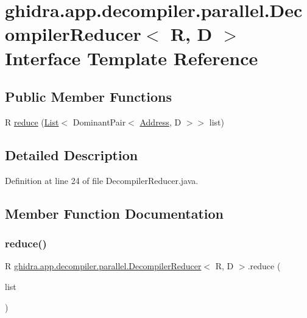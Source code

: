 \hypertarget{interfaceghidra_1_1app_1_1decompiler_1_1parallel_1_1_decompiler_reducer}{}\section{ghidra.\+app.\+decompiler.\+parallel.\+Decompiler\+Reducer$<$ R, D $>$ Interface Template Reference}
\label{interfaceghidra_1_1app_1_1decompiler_1_1parallel_1_1_decompiler_reducer}
\subsection*{Public Member Functions}
\begin{DoxyCompactItemize}
\item 
R \mbox{\hyperlink{interfaceghidra_1_1app_1_1decompiler_1_1parallel_1_1_decompiler_reducer_a479b06c3afdce6208bcb437b5c856f50}{reduce}} (\mbox{\hyperlink{xml_8hh_ab5ab62f46b3735557c125f91b40ac155}{List}}$<$ Dominant\+Pair$<$ \mbox{\hyperlink{class_address}{Address}}, D $>$$>$ list)
\end{DoxyCompactItemize}


\subsection{Detailed Description}


Definition at line 24 of file Decompiler\+Reducer.\+java.



\subsection{Member Function Documentation}
\mbox{\label{interfaceghidra_1_1app_1_1decompiler_1_1parallel_1_1_decompiler_reducer_a479b06c3afdce6208bcb437b5c856f50}} 
\subsubsection{\texorpdfstring{reduce()}{reduce()}}
{\footnotesize\ttfamily R \mbox{\hyperlink{interfaceghidra_1_1app_1_1decompiler_1_1parallel_1_1_decompiler_reducer}{ghidra.\+app.\+decompiler.\+parallel.\+Decompiler\+Reducer}}$<$ R, D $>$.reduce (\begin{DoxyParamCaption}\item[{\mbox{\hyperlink{xml_8hh_ab5ab62f46b3735557c125f91b40ac155}{List}}$<$ Dominant\+Pair$<$ \mbox{\hyperlink{class_address}{Address}}, D $>$$>$}]{list }\end{DoxyParamCaption})}



